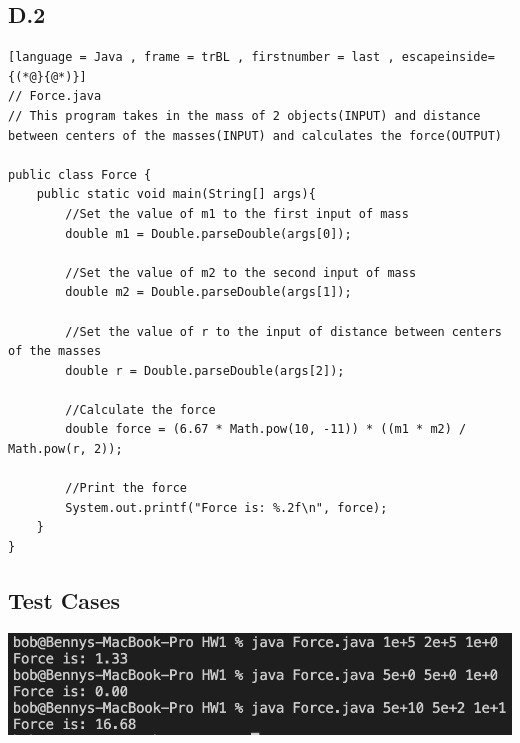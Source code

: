 \documentclass{article}
\begin{document}
\subsection*{D.2}

\begin{lstlisting}[language = Java , frame = trBL , firstnumber = last , escapeinside={(*@}{@*)}]
// Force.java
// This program takes in the mass of 2 objects(INPUT) and distance between centers of the masses(INPUT) and calculates the force(OUTPUT)

public class Force {
    public static void main(String[] args){
        //Set the value of m1 to the first input of mass
        double m1 = Double.parseDouble(args[0]); 

        //Set the value of m2 to the second input of mass
        double m2 = Double.parseDouble(args[1]); 

        //Set the value of r to the input of distance between centers of the masses
        double r = Double.parseDouble(args[2]); 

        //Calculate the force
        double force = (6.67 * Math.pow(10, -11)) * ((m1 * m2) / Math.pow(r, 2)); 

        //Print the force
        System.out.printf("Force is: %.2f\n", force); 
    }
}   
\end{lstlisting}

\subsection*{Test Cases}

\begin{center}
    \includegraphics*[scale = .65]{./images/q4test.png}
\end{center}
\end{document}
